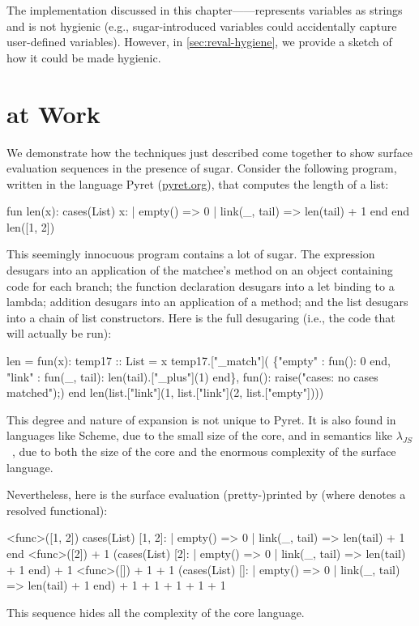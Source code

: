The implementation discussed in this
chapter---{\Resugarer}---represents variables as strings and is not
hygienic (e.g., sugar-introduced variables could accidentally capture
user-defined variables). However, in \cref{sec:reval-hygiene}, we
provide a sketch of how it could be made hygienic.


\section{{\Resugarer} at Work}
\label{sec:reval-pyret-example}

We demonstrate how the techniques just described come together to show
surface evaluation sequences in the presence of sugar. Consider the
following program, written in the language Pyret (\url{pyret.org}), 
that computes the length of a list:
\begin{Codes}
    fun len(x):
      cases(List) x:
        | empty() => 0
        | link(_, tail) => len(tail) + 1
      end
    end
    len([1, 2])
\end{Codes}
This seemingly innocuous program contains a lot of sugar. The 
expression desugars into an application of the matchee's 
method on an object containing code for each branch; the function
declaration desugars into a let binding to a lambda; addition desugars
into an application of a  method; and the list \Code{[1, 2]}
desugars into a chain of list constructors. Here is the full desugaring
(i.e., the code that will actually be run):
\begin{Codes}
len = fun(x):
    temp17 :: List = x
    temp17.["_match"](
      \{"empty" : fun(): 0 end,
       "link" : fun(_, tail):
                len(tail).["_plus"](1) end\},
      fun(): raise("cases: no cases matched");)
    end
len(list.["link"](1, list.["link"](2, list.["empty"])))
\end{Codes}
This degree and nature of expansion is not unique to Pyret.
It is also found in languages like Scheme, due
to the small size of the core, and in semantics like
$\lambda_{JS}$~\cite{lambda-js},
due to both the size of the core and the enormous complexity
of the surface language.

Nevertheless, here is the surface evaluation (pretty-)printed by {\Resugarer} (where
 denotes a resolved functional):
\begin{Codes}
\SurfStep <func>([1, 2])
\SurfStep cases(List) [1, 2]:
      | empty() => 0
      | link(_, tail) => len(tail) + 1
    end
\SurfStep <func>([2]) + 1
\SurfStep (cases(List) [2]:
      | empty() => 0
      | link(_, tail) => len(tail) + 1
    end) + 1
\SurfStep <func>([]) + 1 + 1
\SurfStep (cases(List) []:
      | empty() => 0
      | link(_, tail) => len(tail) + 1
    end) + 1 + 1
 + 1 + 1
 + 1
\end{Codes}
This sequence hides all the complexity of the core language.


